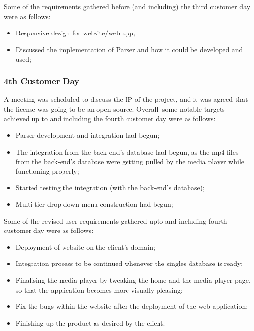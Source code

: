 \documentclass{l3proj}
\begin{document}
Some of the requirements gathered before (and including) the third customer day were as follows:
\begin{itemize}
    \item Responsive design for website/web app;
\item Discussed the implementation of Parser and how it could be developed and used;
\end{itemize}

\subsubsection{4th Customer Day}
A meeting was scheduled to discuss the IP of the project, and it was agreed that the license was going to be an open source. 
Overall, some notable targets achieved up to and including the fourth customer day were as follows:
\begin{itemize}
    \item  Parser development and integration had begun;
\item The integration from the back-end’s database had begun, as the mp4 files from the back-end’s database were getting pulled by the media player while functioning properly;
\item Started testing the integration (with the back-end’s database);
\item Multi-tier drop-down menu construction had begun;
\end{itemize}

Some of the revised user requirements gathered upto and including fourth customer day were as follows:
\begin{itemize}
    \item Deployment of website on the client’s domain;
\item  Integration process to be continued whenever the singles database is ready;
\item Finalising the media player by tweaking the home and the media player page, so that the application becomes more visually pleasing;
\item Fix the bugs within the website after the deployment of the web application;
\item Finishing up the product as desired by the client.
\end{itemize}
\end{document}
